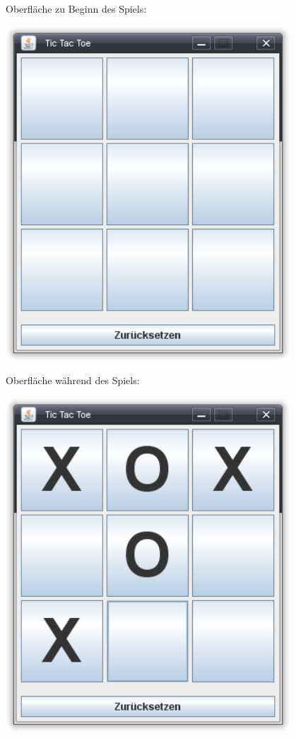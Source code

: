 \begin{minipage}{0.5\textwidth}
Oberfläche zu Beginn des Spiels:

\includegraphics[width=0.8\textwidth]{./inf/SEKII/24_Java_GUI-Komponenten/TicTacToe_1.png}
\end{minipage}
\begin{minipage}{0.5\textwidth}
Oberfläche während des Spiels:

\includegraphics[width=0.8\textwidth]{./inf/SEKII/24_Java_GUI-Komponenten/TicTacToe_2.png}       
\end{minipage}

